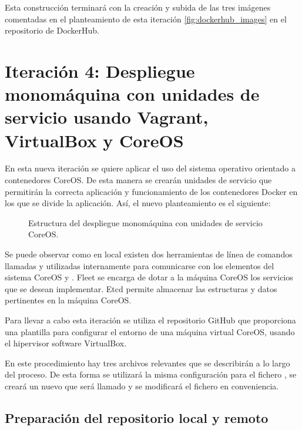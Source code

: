 Esta construcción terminará con la creación y subida de las tres imágenes comentadas en el planteamiento de esta iteración \ref{fig:dockerhub_images} en el repositorio de DockerHub.

\section[Despliegue Monomáquina en VirtualBox]{Iteración 4: Despliegue monomáquina con unidades de servicio usando Vagrant, VirtualBox y CoreOS}

En esta nueva iteración se quiere aplicar el uso del sistema operativo orientado a contenedores CoreOS. De esta manera se crearán unidades de servicio  que permitirán la correcta aplicación y funcionamiento de los contenedores Docker en los que se divide la aplicación. Así, el nuevo planteamiento es el siguiente:

\begin{figure}[H] 
\centering
{}
\caption{Estructura del despliegue monomáquina con unidades de servicio CoreOS.\label{fig:coreosdiagram}}
\end{figure}

Se puede observar como en local existen dos herramientas de línea de comandos llamadas  y  utilizadas internamente para comunicarse con los elementos del sistema CoreOS  y . Fleet se encarga de dotar a la máquina CoreOS los servicios que se desean implementar. Etcd permite almacenar las estructuras y datos pertinentes en la máquina CoreOS.

Para llevar a cabo esta iteración se utiliza el repositorio GitHub  que proporciona una plantilla  para configurar el entorno de una máquina virtual CoreOS, usando el hipervisor software VirtualBox.

En este procedimiento hay tres archivos relevantes que se describirán a lo largo del proceso. De esta forma se utilizará la misma configuración para el fichero , se creará un nuevo  que será llamado  y se modificará el fichero  en conveniencia.

\subsection{Preparación del repositorio local y remoto}

